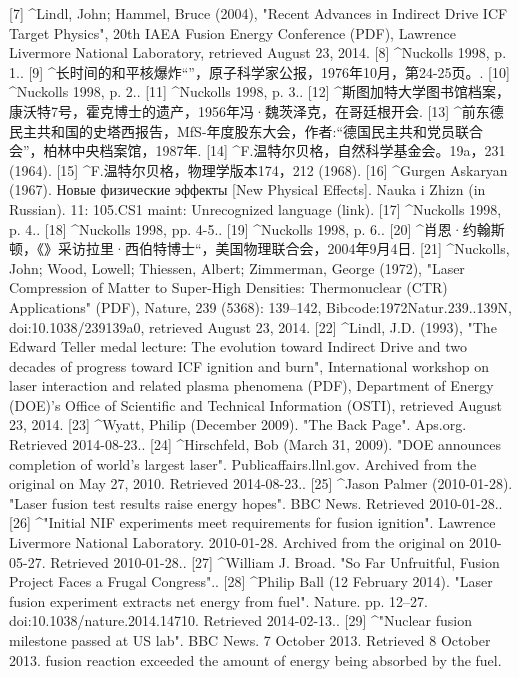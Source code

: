 [7]
^Lindl, John; Hammel, Bruce (2004), "Recent Advances in Indirect Drive ICF Target Physics", 20th IAEA Fusion Energy Conference (PDF), Lawrence Livermore National Laboratory, retrieved August 23, 2014.
[8]
^Nuckolls 1998, p. 1..
[9]
^长时间的和平核爆炸“”，原子科学家公报，1976年10月，第24-25页。.
[10]
^Nuckolls 1998, p. 2..
[11]
^Nuckolls 1998, p. 3..
[12]
^斯图加特大学图书馆档案，康沃特7号，霍克博士的遗产，1956年冯·魏茨泽克，在哥廷根开会.
[13]
^前东德民主共和国的史塔西报告，MfS-年度股东大会，作者:“德国民主共和党员联合会”，柏林中央档案馆，1987年.
[14]
^F.温特尔贝格，自然科学基金会。19a，231 (1964).
[15]
^F.温特尔贝格，物理学版本174，212 (1968).
[16]
^Gurgen Askaryan (1967). Новые физические эффекты [New Physical Effects]. Nauka i Zhizn (in Russian). 11: 105.CS1 maint: Unrecognized language (link).
[17]
^Nuckolls 1998, p. 4..
[18]
^Nuckolls 1998, pp. 4-5..
[19]
^Nuckolls 1998, p. 6..
[20]
^肖恩·约翰斯顿，《》采访拉里·西伯特博士“，美国物理联合会，2004年9月4日.
[21]
^Nuckolls, John; Wood, Lowell; Thiessen, Albert; Zimmerman, George (1972), "Laser Compression of Matter to Super-High Densities: Thermonuclear (CTR) Applications" (PDF), Nature, 239 (5368): 139–142, Bibcode:1972Natur.239..139N, doi:10.1038/239139a0, retrieved August 23, 2014.
[22]
^Lindl, J.D. (1993), "The Edward Teller medal lecture: The evolution toward Indirect Drive and two decades of progress toward ICF ignition and burn", International workshop on laser interaction and related plasma phenomena (PDF), Department of Energy (DOE)'s Office of Scientific and Technical Information (OSTI), retrieved August 23, 2014.
[23]
^Wyatt, Philip (December 2009). "The Back Page". Aps.org. Retrieved 2014-08-23..
[24]
^Hirschfeld, Bob (March 31, 2009). "DOE announces completion of world's largest laser". Publicaffairs.llnl.gov. Archived from the original on May 27, 2010. Retrieved 2014-08-23..
[25]
^Jason Palmer (2010-01-28). "Laser fusion test results raise energy hopes". BBC News. Retrieved 2010-01-28..
[26]
^"Initial NIF experiments meet requirements for fusion ignition". Lawrence Livermore National Laboratory. 2010-01-28. Archived from the original on 2010-05-27. Retrieved 2010-01-28..
[27]
^William J. Broad. "So Far Unfruitful, Fusion Project Faces a Frugal Congress"..
[28]
^Philip Ball (12 February 2014). "Laser fusion experiment extracts net energy from fuel". Nature. pp. 12–27. doi:10.1038/nature.2014.14710. Retrieved 2014-02-13..
[29]
^"Nuclear fusion milestone passed at US lab". BBC News. 7 October 2013. Retrieved 8 October 2013. fusion reaction exceeded the amount of energy being absorbed by the fuel.
